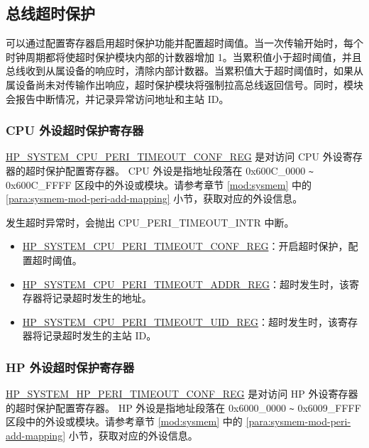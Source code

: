 \documentclass[main\_\_CN.tex]{subfiles}
\begin{document}
\subsection{总线超时保护}

\chipname{} 可以通过配置寄存器启用超时保护功能并配置超时阈值。当一次传输开始时，每个时钟周期都将使超时保护模块内部的计数器增加 1。当累积值小于超时阈值，并且总线收到从属设备的响应时，清除内部计数器。当累积值大于超时阈值时，如果从属设备尚未对传输作出响应，超时保护模块将强制拉高总线返回信号。同时，模块会报告中断情况，并记录异常访问地址和主站 ID。

\subsubsection{CPU 外设超时保护寄存器}

\hyperref[regdesc:HPSYSTEMCPUPERITIMEOUTCONFREG]{HP\_SYSTEM\_CPU\_PERI\_TIMEOUT\_CONF\_REG} 是对访问 CPU 外设寄存器的超时保护配置寄存器。
CPU 外设是指地址段落在 0x600C\_0000 \verb+~+ 0x600C\_FFFF 区段中的外设或模块。请参考章节 \ref{mod:sysmem} \textit{} 中的 \ref{para:sysmem-mod-peri-add-mapping} \textit{} 小节，获取对应的外设信息。

发生超时异常时，会抛出 CPU\_PERI\_TIMEOUT\_INTR 中断。

\begin{itemize}
    \item \hyperref[regdesc:HPSYSTEMCPUPERITIMEOUTCONFREG]{HP\_SYSTEM\_CPU\_PERI\_TIMEOUT\_CONF\_REG}：开启超时保护，配置超时阈值。
    \item \hyperref[regdesc:HPSYSTEMCPUPERITIMEOUTADDRREG]{HP\_SYSTEM\_CPU\_PERI\_TIMEOUT\_ADDR\_REG}：超时发生时，该寄存器将记录超时发生的地址。
    \item \hyperref[regdesc:HPSYSTEMCPUPERITIMEOUTUIDREG]{HP\_SYSTEM\_CPU\_PERI\_TIMEOUT\_UID\_REG}：超时发生时，该寄存器将记录超时发生的主站 ID。
\end{itemize}


\subsubsection{HP 外设超时保护寄存器}

\hyperref[regdesc:HPSYSTEMHPPERITIMEOUTCONFREG]{HP\_SYSTEM\_HP\_PERI\_TIMEOUT\_CONF\_REG} 是对访问 HP 外设寄存器的超时保护配置寄存器。
HP 外设是指地址段落在 0x6000\_0000 \verb+~+ 0x6009\_FFFF 区段中的外设或模块。请参考章节 \ref{mod:sysmem} \textit{} 中的 \ref{para:sysmem-mod-peri-add-mapping} \textit{} 小节，获取对应的外设信息。
\end{document}
